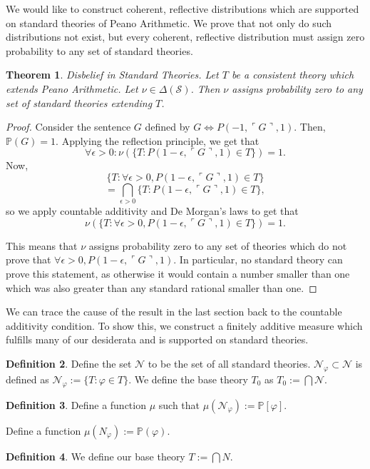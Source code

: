\documentclass[12pt]{article}
\newcommand{\PP}{\mathbb{P}}
\newcommand{\vp}{\varphi}
\theoremstyle{plain}
\newtheorem{theorem}{Theorem}[subsection]
\theoremstyle{definition}
\newtheorem{definition}[theorem]{Definition}
\theoremstyle{remark}
\begin{document}
We would like to construct coherent, reflective distributions which are supported on standard theories of Peano Arithmetic.
We prove that not only do such distributions not exist, but every coherent, reflective distribution must assign zero probability to any set of standard theories. 
\begin{theorem} \emph{Disbelief in Standard Theories.}
Let $T$ be a consistent theory which extends Peano Arithmetic.
Let $\nu\in\Delta(\mathcal{S})$.
Then $\nu$ assigns probability zero to any set of standard theories extending $T$.
\end{theorem}
\begin{proof}
Consider the sentence $G$ defined by $G \iff P(- 1,\ulcorner G\urcorner, 1)$. Then, $\mathbb{P}(G)=1$.
Applying the reflection principle, we get that
$$\forall\epsilon>0: \nu(\{T:P( 1- \epsilon,\ulcorner G\urcorner, 1)\in T\})= 1.$$
Now,
$$\{T:\forall \epsilon>0,P( 1- \epsilon,\ulcorner G\urcorner, 1)\in T\}$$
$$=\bigcap_{\epsilon>0}\{T:P( 1- \epsilon,\ulcorner G\urcorner, 1)\in T\},$$
so we apply countable additivity and De Morgan's laws to get that $$\nu(\{T:\forall \epsilon>0,P( 1- \epsilon,\ulcorner G\urcorner, 1)\in T\})=1.$$

This means that $\nu$ assigns probability zero to any set of theories which do not prove that $\forall \epsilon>0,P( 1- \epsilon,\ulcorner G\urcorner, 1)$. 
In particular, no standard theory can prove this statement, as otherwise it would contain a number smaller than one which was also greater than any standard rational smaller than one.
\end{proof}
We can trace the cause of the result in the last section back to the countable additivity condition. To show this, we construct a finitely additive measure which fulfills many of our desiderata and is supported on standard theories.
\begin{definition}
Define the set $\mathcal{N}$ to be the set of all standard theories. $\mathcal{N}_{\varphi}\subset \mathcal{N}$ is defined as $\mathcal{N} _{\varphi}:=\{T:\varphi\in T\}$.
We define the base theory $T_0$ as $T_0:=\bigcap \mathcal{N}$.
\end{definition}
\begin{definition}
Define a function $\mu$ such that $\mu(\mathcal{N}_{\varphi}):=\mathbb{P}[\varphi]$.

Define a function $\mu(N_{\vp}):=\PP(\vp)$.
\end{definition}
\begin{definition}
We define our base theory $T:=\bigcap N$.
\end{definition}
\end{document}
